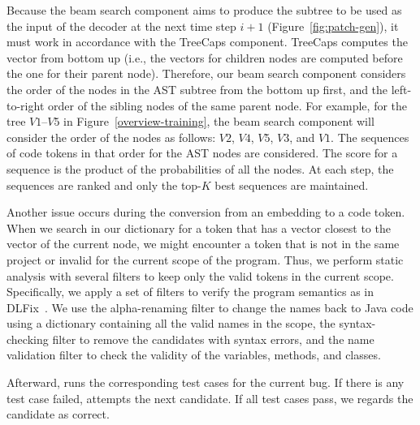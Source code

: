 Because the beam search component aims to produce the subtree to be
used as the input of the decoder at the next time step $i+1$
(Figure~\ref{fig:patch-gen}), it must work in accordance with the
TreeCaps component. TreeCaps computes the vector from bottom up (i.e.,
the vectors for children nodes are computed before the one for their
parent node). Therefore, our beam search component considers the order
of the nodes in the AST subtree from the bottom up first, and the
left-to-right order of the sibling nodes of the same parent node. For
example, for the tree $V1$--$V5$ in Figure~\ref{overview-training},
the beam search component will consider the order of the nodes as
follows: $V2$, $V4$, $V5$, $V3$, and $V1$. The sequences of code
tokens in that order for the AST nodes are considered. The score for a
sequence is the product of the probabilities of all the nodes. At each
step, the sequences are ranked and only the top-$K$ best sequences are
maintained.

Another issue occurs during the conversion from an embedding to a code
token. When we search in our dictionary for a token that has a vector
closest to the vector of the current node, we
might encounter a token that is not in the same project or invalid for
the current scope of the program. Thus, we perform static analysis
with several filters to keep only the valid tokens in the current
scope. Specifically, we apply a set of filters to verify the program
semantics as in DLFix~\cite{icse20}. We use the alpha-renaming filter
to change the names back to Java code using a dictionary
containing all the valid names in the scope, the syntax-checking
filter to remove the candidates with syntax errors, and the name
validation filter to check the validity of the variables, methods, and
classes.

Afterward, \tool runs the corresponding test cases for the current
bug. If there is any test case failed, \tool attempts the next
candidate. If all test cases pass, we regards the candidate as
correct.


